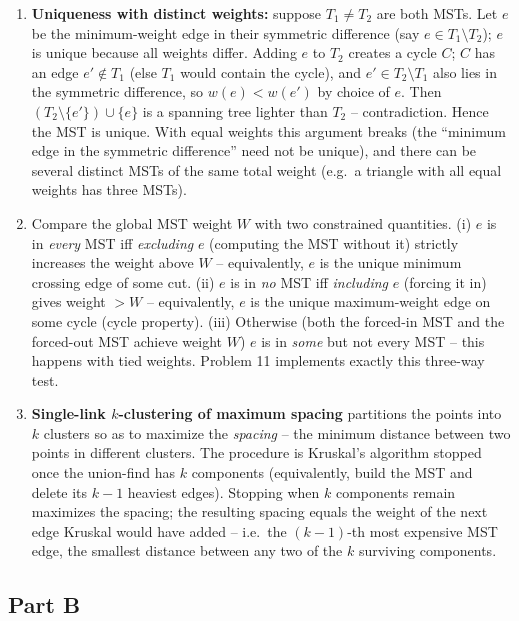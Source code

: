 \documentclass[11pt]{article}
\begin{document}
\begin{enumerate}[label=\textbf{A\arabic*.}, leftmargin=2.2em]
\item \textbf{Uniqueness with distinct weights:} suppose $T_1\ne T_2$ are both
MSTs. Let $e$ be the minimum-weight edge in their symmetric difference (say $e\in
T_1\setminus T_2$); $e$ is unique because all weights differ. Adding $e$ to $T_2$
creates a cycle $C$; $C$ has an edge $e'\notin T_1$ (else $T_1$ would contain the
cycle), and $e'\in T_2\setminus T_1$ also lies in the symmetric difference, so
$w(e)<w(e')$ by choice of $e$. Then $(T_2\setminus\{e'\})\cup\{e\}$ is a spanning
tree lighter than $T_2$ -- contradiction. Hence the MST is unique. With equal
weights this argument breaks (the ``minimum edge in the symmetric difference''
need not be unique), and there can be several distinct MSTs of the same total
weight (e.g.\ a triangle with all equal weights has three MSTs).

\item Compare the global MST weight $W$ with two constrained quantities. (i) $e$
is in \emph{every} MST iff \emph{excluding} $e$ (computing the MST without it)
strictly increases the weight above $W$ -- equivalently, $e$ is the unique
minimum crossing edge of some cut. (ii) $e$ is in \emph{no} MST iff
\emph{including} $e$ (forcing it in) gives weight $>W$ -- equivalently, $e$ is the
unique maximum-weight edge on some cycle (cycle property). (iii) Otherwise (both
the forced-in MST and the forced-out MST achieve weight $W$) $e$ is in
\emph{some} but not every MST -- this happens with tied weights. Problem 11
implements exactly this three-way test.

\item \textbf{Single-link $k$-clustering of maximum spacing} partitions the
points into $k$ clusters so as to maximize the \emph{spacing} -- the minimum
distance between two points in different clusters. The procedure is Kruskal's
algorithm stopped once the union-find has $k$ components (equivalently, build the
MST and delete its $k-1$ heaviest edges). Stopping when $k$ components remain
maximizes the spacing; the resulting spacing equals the weight of the next edge
Kruskal would have added -- i.e.\ the $(k-1)$-th most expensive MST edge, the
smallest distance between any two of the $k$ surviving components.

\end{enumerate}

\subsection*{Part B}
\end{document}
